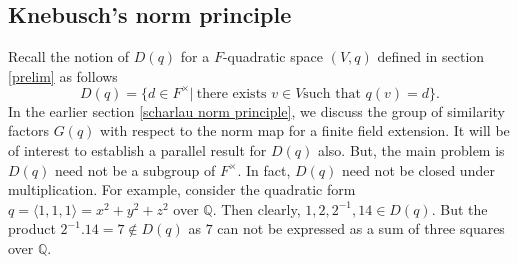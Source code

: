 \documentclass[sn-mathphys-num]{sn-jnl}%
\begin{document}
\subsection{Knebusch's norm principle}
Recall the notion of $D(q)$ for a $F$-quadratic space $(V,q)$ defined in section \ref{prelim} as follows
\[D(q)=\{ d \in F^\times |\ \text{there exists } v \in V \text{such that }q(v)=d \}.\]  
In the earlier section \ref{scharlau norm principle}, we discuss the group of similarity factors $G(q)$ with respect to the norm map for a finite field extension. It will be of interest to establish a parallel result for $D(q)$ also. But, the main problem is $D(q)$ need not be a subgroup of $F^\times$. In fact, $D(q)$ need not be closed under multiplication. For example, consider the quadratic form $q= \langle 1,1,1 \rangle = x^2+y^2+z^2$ over $\mathbb Q$. Then clearly, $1,2,2^{-1},14 \in D(q)$. But the product $2^{-1}.14=7 \notin D(q)$ as $7$ can not be expressed as a sum of three squares over $\mathbb Q$. 
\medskip
\end{document}
